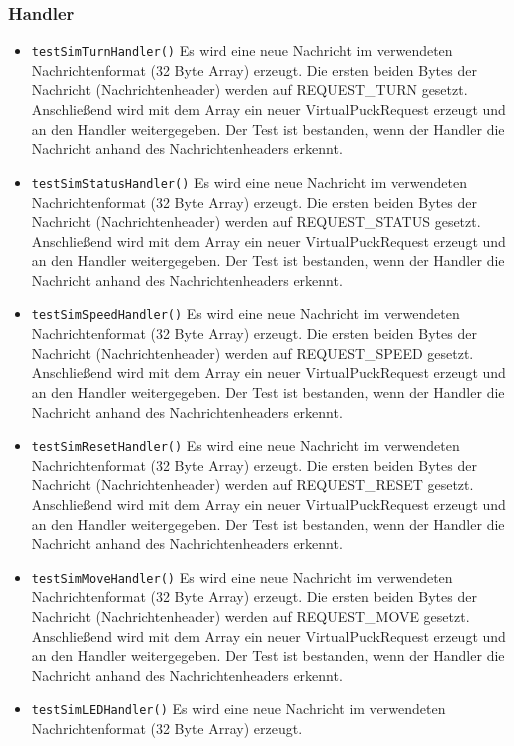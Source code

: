 \documentclass[10pt,a4paper]{article}
\begin{document}
			\subsubsection{Handler}
			\begin{itemize}
				\item \texttt{testSimTurnHandler()} Es wird eine neue Nachricht im verwendeten Nachrichtenformat (32 Byte Array) erzeugt.
				Die ersten beiden Bytes der Nachricht (Nachrichtenheader) werden auf REQUEST\_TURN gesetzt. Anschließend wird mit dem Array ein neuer
				VirtualPuckRequest erzeugt und an den Handler weitergegeben.
				Der Test ist bestanden, wenn der Handler die Nachricht anhand des Nachrichtenheaders erkennt.
				\item \texttt{testSimStatusHandler()} Es wird eine neue Nachricht im verwendeten Nachrichtenformat (32 Byte Array) erzeugt.
				Die ersten beiden Bytes der Nachricht (Nachrichtenheader) werden auf REQUEST\_STATUS gesetzt. Anschließend wird mit dem Array ein
				neuer VirtualPuckRequest erzeugt und an den Handler weitergegeben.
				Der Test ist bestanden, wenn der Handler die Nachricht anhand des Nachrichtenheaders erkennt.
				\item \texttt{testSimSpeedHandler()} Es wird eine neue Nachricht im verwendeten Nachrichtenformat (32 Byte Array) erzeugt.
				Die ersten beiden Bytes der Nachricht (Nachrichtenheader) werden auf REQUEST\_SPEED gesetzt. Anschließend wird mit dem Array ein
				neuer VirtualPuckRequest erzeugt und an den Handler weitergegeben.
				Der Test ist bestanden, wenn der Handler die Nachricht anhand des Nachrichtenheaders erkennt.
				\item \texttt{testSimResetHandler()} Es wird eine neue Nachricht im verwendeten Nachrichtenformat (32 Byte Array) erzeugt.
				Die ersten beiden Bytes der Nachricht (Nachrichtenheader) werden auf REQUEST\_RESET gesetzt. Anschließend wird mit dem Array ein neuer
				VirtualPuckRequest erzeugt und an den Handler weitergegeben.
				Der Test ist bestanden, wenn der Handler die Nachricht anhand des Nachrichtenheaders erkennt.
				\item \texttt{testSimMoveHandler()} Es wird eine neue Nachricht im verwendeten Nachrichtenformat (32 Byte Array) erzeugt.
				Die ersten beiden Bytes der Nachricht (Nachrichtenheader) werden auf REQUEST\_MOVE gesetzt. Anschließend wird mit dem Array ein neuer
				VirtualPuckRequest erzeugt und an den Handler weitergegeben.
				Der Test ist bestanden, wenn der Handler die Nachricht anhand des Nachrichtenheaders erkennt.
				\item \texttt{testSimLEDHandler()} Es wird eine neue Nachricht im verwendeten Nachrichtenformat (32 Byte Array) erzeugt.

\end{itemize}
\end{document}
